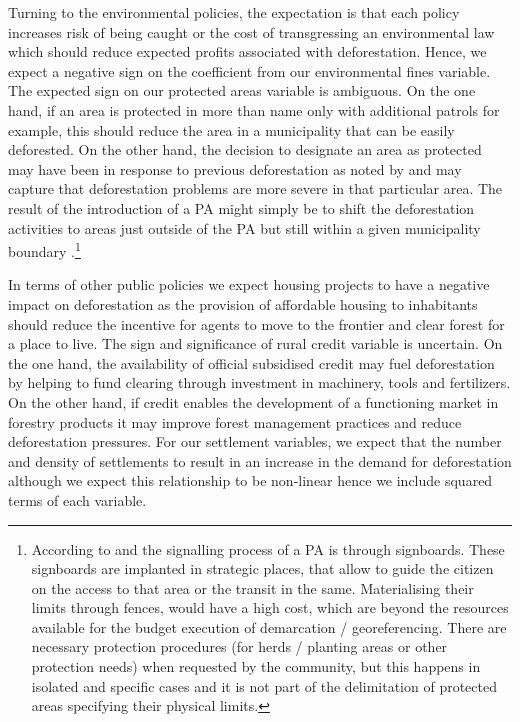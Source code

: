 Turning to the environmental policies, the expectation is that each policy increases risk of being caught or the cost of transgressing an environmental law which should reduce expected profits associated with deforestation. Hence, we expect a negative sign on the coefficient from our environmental fines variable. The expected sign on our protected areas variable is ambiguous.  On the one hand, if an area is protected in more than name only with additional patrols for example, this should reduce the area in a municipality that can be easily deforested.  On the other hand, the decision to designate an area as protected may have been in response to previous deforestation  as noted by \citet{hargrave_kis-katos_2012} and may capture that deforestation problems are more severe in that particular area. The result of the introduction of a PA might simply be to shift the deforestation activities to areas just outside of the PA but still within a given municipality boundary \citep{GIRARDI}.\footnote{According to \citet{ICMBIO} and \citet{FUNAI} the signalling process of a PA is through signboards. These signboards are implanted in strategic places, that allow to guide the citizen on the access to that area or the transit in the same. Materialising their limits through fences, would have a high cost, which are beyond the resources available for the budget execution of demarcation / georeferencing. There are necessary protection procedures (for herds / planting areas or other protection needs) when requested by the community, but this happens in isolated and specific cases and it is not part of the delimitation of protected areas specifying their physical limits.}

In terms of other public policies we expect housing projects to have a negative impact on deforestation as the provision of affordable housing to inhabitants should reduce the incentive for agents to move to the frontier and clear forest for a place to live. The sign and significance of rural credit variable is uncertain. On the one hand, the availability of official subsidised credit may fuel deforestation by helping to fund clearing through investment in machinery, tools and fertilizers. On the other hand, if credit enables the development of a functioning market in forestry products it may improve forest management practices and reduce deforestation pressures. For our settlement variables, we expect that the number and density of settlements to result in an increase in the demand for deforestation although we expect this relationship to be non-linear hence we include squared terms of each variable.

